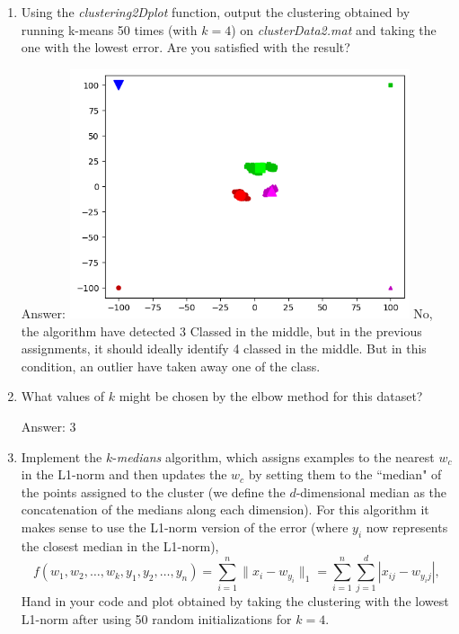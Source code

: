 \documentclass{article}
\def\ans#1{\par\gre{Answer: #1}}
\def\blu#1{{\color{blu}#1}}
\def\gre#1{{\color{gre}#1}}
\def\norm#1{\|#1\|}
\def\enum#1{\begin{enumerate}#1\end{enumerate}}
\begin{document}
 \blu{\enum{
 \item Using the \emph{clustering2Dplot} function, output the clustering obtained by running k-means 50 times (with $k=4$) on \emph{clusterData2.mat} and taking the one with the lowest error. Are you satisfied with the result?  \ans{ \includegraphics[width=10cm]{q1Class.png}  No, the algorithm have detected 3 Classed in the middle, but in the previous assignments, it should ideally identify 4 classed in the middle. But in this condition, an outlier have taken away one of the class.}
 \item What values of $k$ might be chosen by the elbow method for this dataset? \ans{3}
 \item Implement the $k$-\emph{medians} algorithm, which assigns examples to the nearest $w_c$ in the L1-norm and then updates the $w_c$ by setting them to the ``median" of the points assigned to the cluster (we define the $d$-dimensional median as the concatenation of the medians along each dimension). For this algorithm it makes sense to use the L1-norm version of the error (where $y_i$ now represents the closest median in the L1-norm),
\[
f(w_1,w_2,\dots,w_k,y_1,y_2,\dots,y_n) = \sum_{i=1}^n \norm{x_i - w_{y_i}}_1 = \sum_{i=1}^n \sum_{j=1}^d |x_{ij} - w_{y_ij}|,
\] 
 Hand in your code and plot obtained by taking the clustering with the lowest L1-norm after using  50 random initializations for $k = 4$.
}}
\end{document}
